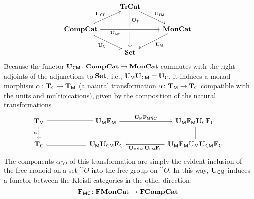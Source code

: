 \documentclass[12pt,oneside,article,draft]{memoir}
\begin{document}
\begin{equation*}
   \begin{tikzcd}
      & \TrCat \ar[dr,"\UTM"] \ar[dd,"\UT" near start] & \\
      \CompCat \ar[rr,crossing over,"\UCM"' near start] \ar[dr,"\UC"'] \ar[ru,"\UCT"]
         && \MonCat \ar[dl,"\UM"] \\
      & \Set &
   \end{tikzcd}
\end{equation*}
Because the functor $\mathbf{U}_{\mathsf{CM}}\colon\mathbf{CompCat}\to\mathbf{MonCat}$ commutes with the right adjoints of the
adjunctions to $\mathbf{Set}$, i.e., $\mathbf{U}_{\mathsf{M}}\mathbf{U}_{\mathsf{CM}}=\mathbf{U}_{\mathsf{C}}$, it induces a monad morphism $\alpha\colon\mathbf{T}_{\mathsf{C}}\to\mathbf{T}_{\mathsf{M}}$ (a natural transformation
$\alpha\colon\mathbf{T}_{\mathsf{M}}\to\mathbf{T}_{\mathsf{C}}$ compatible with the units and multipications), given by the composition of
the natural transformations
\begin{equation*}
	\begin{tikzcd}[column sep=2cm]
		\TM\ar[r,equal]\ar[d,dashed,"\alpha"']&\UM\FM\ar[r,"\UM\FM\eta_C"]&\UM\FM\UC\FC\ar[d,equal]\\
		\TC&\UM\UCM\FC\ar[l,equal]&\UM\FM\UM\UCM\FC\ar[l,"\UM\epsilon_M\UCM\FC"]
	\end{tikzcd}
\end{equation*}
The components $\alpha_{\cat{O}}$ of this transformation are simply the evident inclusion of the free monoid on a set
$\cat{O}$ into the free group on $\cat{O}$. In this way, $\mathbf{U}_{\mathsf{CM}}$ induces a functor between the Kleisli categories in the other direction:
\begin{equation}\label{eqn:FMC}
   \mathbf{F}_{\mathsf{MC}}\colon\mathbf{FMonCat}\to\mathbf{FCompCat}
\end{equation}

%
\end{document}
